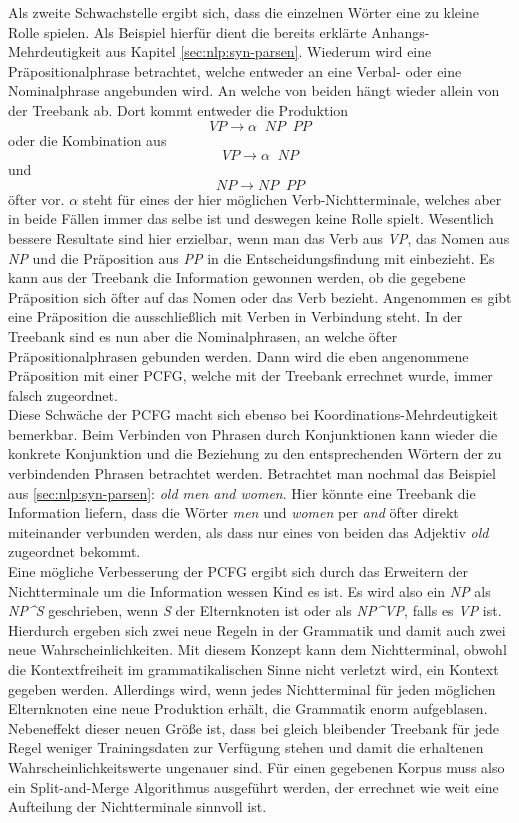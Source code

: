 Als zweite Schwachstelle ergibt sich, dass die einzelnen Wörter eine zu kleine Rolle spielen. Als Beispiel hierfür dient die bereits erklärte Anhangs-Mehrdeutigkeit aus Kapitel \ref{sec:nlp:syn-parsen}. Wiederum wird eine Präpositionalphrase betrachtet, welche entweder an eine Verbal- oder eine Nominalphrase angebunden wird. An welche von beiden hängt wieder allein von der Treebank ab. Dort kommt entweder die Produktion \[ VP  \to  \alpha \;\;  NP \;\; PP \] oder die Kombination aus \[ VP  \to  \alpha \;\; NP \] und \[ NP  \to  NP \;\; PP \] öfter vor. \( \alpha \) steht für eines der hier möglichen Verb-Nichtterminale, welches aber in beide Fällen immer das selbe ist und deswegen keine Rolle spielt. Wesentlich bessere Resultate sind hier erzielbar, wenn man das Verb aus \textit{VP}, das Nomen aus \textit{NP} und die Präposition aus \textit{PP} in die Entscheidungsfindung mit einbezieht. Es kann aus der Treebank die Information gewonnen werden, ob die gegebene Präposition sich öfter auf das Nomen oder das Verb bezieht. Angenommen es gibt eine Präposition die ausschließlich mit Verben in Verbindung steht. In der Treebank sind es nun aber die Nominalphrasen, an welche öfter Präpositionalphrasen gebunden werden. Dann wird die eben angenommene Präposition mit einer PCFG, welche mit der Treebank errechnet wurde, immer falsch zugeordnet. \\ Diese Schwäche der PCFG macht sich ebenso bei Koordinations-Mehrdeutigkeit bemerkbar. Beim Verbinden von Phrasen durch Konjunktionen kann wieder die konkrete Konjunktion und die Beziehung zu den entsprechenden Wörtern der zu verbindenden Phrasen betrachtet werden. Betrachtet man nochmal das Beispiel aus \ref{sec:nlp:syn-parsen}: \textit{old men and women}. Hier könnte eine Treebank die Information liefern, dass die Wörter \textit{men} und \textit{women} per \textit{and} öfter direkt miteinander verbunden werden, als dass nur eines von beiden das Adjektiv \textit{old} zugeordnet bekommt. \\
Eine mögliche Verbesserung der PCFG ergibt sich durch das Erweitern der Nichtterminale um die Information wessen Kind es ist. Es wird also ein \textit{NP} als \textit{NP\^{}S} geschrieben, wenn \textit{S} der Elternknoten ist oder als \textit{NP\^{}VP}, falls es \textit{VP} ist. Hierdurch ergeben sich zwei neue Regeln in der Grammatik und damit auch zwei neue Wahrscheinlichkeiten. Mit diesem Konzept kann dem Nichtterminal, obwohl die Kontextfreiheit im grammatikalischen Sinne nicht verletzt wird, ein Kontext gegeben werden. Allerdings wird, wenn jedes Nichtterminal für jeden möglichen Elternknoten eine neue Produktion erhält, die Grammatik enorm aufgeblasen. Nebeneffekt dieser neuen Größe ist, dass bei gleich bleibender Treebank für jede Regel weniger Trainingsdaten zur Verfügung stehen und damit die erhaltenen Wahrscheinlichkeitswerte ungenauer sind. Für einen gegebenen Korpus muss also ein Split-and-Merge Algorithmus ausgeführt werden, der errechnet wie weit eine Aufteilung der Nichtterminale sinnvoll ist.  

